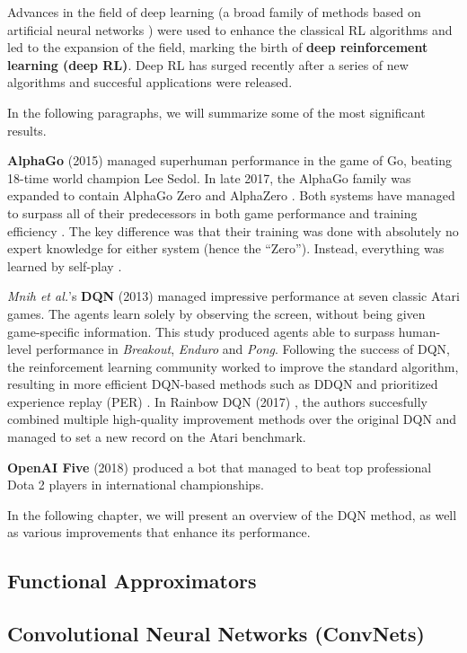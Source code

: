 Advances in the field of deep learning (a broad family of methods based on artificial neural networks \cite{wiki:Deep_learning}) were used to enhance the classical RL algorithms and led to the expansion of the field, marking the birth of \textbf{deep reinforcement learning (deep RL)}.
Deep RL has surged recently after a series of new algorithms and succesful applications were released.

In the following paragraphs, we will summarize some of the most significant results.

\textbf{AlphaGo} (2015) \cite{ago} managed superhuman performance in the game of Go, beating 18-time world champion Lee Sedol.
In late 2017, the AlphaGo family was expanded to contain AlphaGo Zero and AlphaZero \cite{alpha-zero}.
Both systems have managed to surpass all of their predecessors in both game performance and training efficiency \cite{wiki:AlphaGo}.
The key difference was that their training was done with absolutely no expert knowledge for either system (hence the ``Zero'').
Instead, everything was learned by self-play \cite{alpha-zero}.

\textit{Mnih et al.}'s \textbf{DQN} \cite{atari-dqn} (2013) managed impressive performance at seven classic Atari games.
The agents learn solely by observing the screen, without being given game-specific information.
This study produced agents able to surpass human-level performance in \emph{Breakout}, \emph{Enduro} and \emph{Pong}.
Following the success of DQN, the reinforcement learning community worked to improve the standard algorithm, resulting in more efficient DQN-based methods such as DDQN \cite{ddqn-paper} and prioritized experience replay (PER) \cite{per-paper}.
In Rainbow DQN (2017) \cite{rainbow-dqn}, the authors succesfully combined multiple high-quality improvement methods over the original DQN and managed to set a new record on the Atari benchmark.

\textbf{OpenAI Five} \cite{openai-dota} (2018) produced a bot that managed to beat top professional Dota 2 players in international championships.

In the following chapter, we will present an overview of the DQN method, as well as various improvements that enhance its performance.

\subsection{Functional Approximators}

\subsection{Convolutional Neural Networks (ConvNets)}

